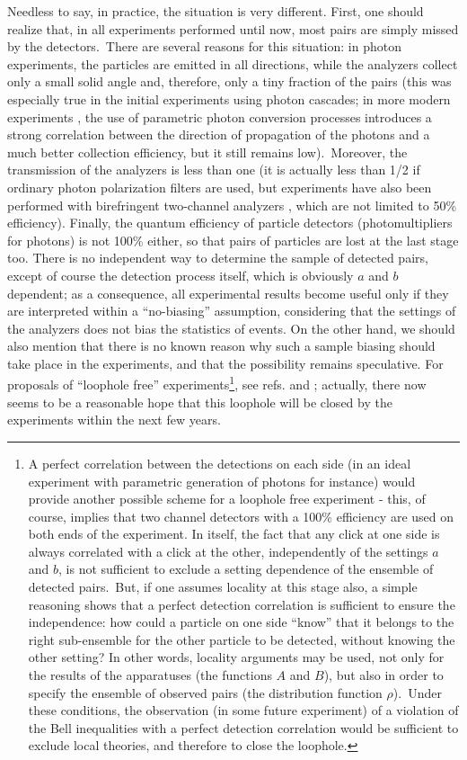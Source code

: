 \documentclass[12pt,onecolumn]{article}%
\begin{document}
Needless to say, in practice, the situation is very different. First, one
should realize that, in all experiments performed until now, most pairs are
simply missed by the detectors.\ There are several reasons for this situation:
in photon experiments, the particles are emitted in all directions, while the
analyzers collect only a small solid angle and, therefore, only a tiny
fraction of the pairs (this was especially true in the initial experiments
using photon cascades; in more modern experiments \cite{parametric}, the use
of parametric photon conversion processes introduces a strong correlation
between the direction of propagation of the photons and a much better
collection efficiency, but it still remains low).\ Moreover, the transmission
of the analyzers is less than one (it is actually less than 1/2 if ordinary
photon polarization filters are used, but experiments have also been performed
with birefringent two-channel analyzers \cite{Aspect}, which are not limited
to 50\% efficiency). Finally, the quantum efficiency of particle detectors
(photomultipliers for photons) is not 100\% either, so that pairs of particles
are lost at the last stage too. There is no independent way to determine the
sample of detected pairs, except of course the detection process itself, which
is obviously $a$ and $b$ dependent; as a consequence, all experimental results
become useful only if they are interpreted within a ``no-biasing'' assumption,
considering that the settings of the analyzers does not bias the statistics of
events. On the other hand, we should also mention that there is no known
reason why such a sample biasing should take place in the experiments, and
that the possibility remains speculative. For proposals of ``loophole free''
experiments\footnote{A perfect correlation between the detections on each side
(in an ideal experiment with parametric generation of photons for instance)
would provide another possible scheme for a loophole free experiment - this,
of course, implies that two channel detectors with a 100\% efficiency are used
on both ends of the experiment. In itself, the fact that any click at one side
is always correlated with a click at the other, independently of the settings
$a$ and $b$, is not sufficient to exclude a setting dependence of the ensemble
of detected pairs.\ But, if one assumes locality at this stage also, a simple
reasoning shows that a perfect detection correlation is sufficient to ensure
the independence: how could a particle on one side ``know'' that it belongs to
the right sub-ensemble for the other particle to be detected, without knowing
the other setting? In other words, locality arguments may be used, not only
for the results of the apparatuses (the functions $A$ and $B$), but also in
order to specify the ensemble of observed pairs (the distribution function
$\rho$).\ Under these conditions, the observation (in some future experiment)
of a violation of the Bell inequalities with a perfect detection correlation
would be sufficient to exclude local theories, and therefore to close the
loophole.}, see refs. \cite{Kwiat} and \cite{Fry-loop}; actually, there now
seems to be a reasonable hope that this loophole will be closed by the
experiments within the next few years.
\end{document}

